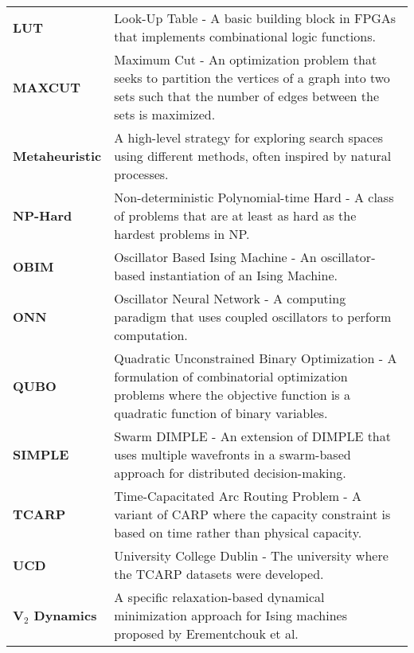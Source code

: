 \begin{tabular}{p{1.5cm}p{14cm}}
\textbf{LUT} & Look-Up Table - A basic building block in FPGAs that implements combinational logic functions. \\[0.2cm]

\textbf{MAXCUT} & Maximum Cut - An optimization problem that seeks to partition the vertices of a graph into two sets such that the number of edges between the sets is maximized. \\[0.2cm]

\textbf{Metaheuristic} & A high-level strategy for exploring search spaces using different methods, often inspired by natural processes. \\[0.2cm]

\textbf{NP-Hard} & Non-deterministic Polynomial-time Hard - A class of problems that are at least as hard as the hardest problems in NP. \\[0.2cm]

\textbf{OBIM} & Oscillator Based Ising Machine - An oscillator-based instantiation of an Ising Machine. \\[0.2cm]

\textbf{ONN} & Oscillator Neural Network - A computing paradigm that uses coupled oscillators to perform computation. \\[0.2cm]

\textbf{QUBO} & Quadratic Unconstrained Binary Optimization - A formulation of combinatorial optimization problems where the objective function is a quadratic function of binary variables. \\[0.2cm]

\textbf{SIMPLE} & Swarm DIMPLE - An extension of DIMPLE that uses multiple wavefronts in a swarm-based approach for distributed decision-making. \\[0.2cm]

\textbf{TCARP} & Time-Capacitated Arc Routing Problem - A variant of CARP where the capacity constraint is based on time rather than physical capacity. \\[0.2cm]

\textbf{UCD} & University College Dublin - The university where the TCARP datasets were developed. \\[0.2cm]

\textbf{V$_2$ Dynamics} & A specific relaxation-based dynamical minimization approach for Ising machines proposed by Erementchouk et al.
\end{tabular}